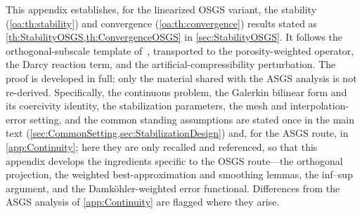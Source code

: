 This appendix establishes, for the linearized OSGS variant, the stability
(\cref{oa:th:stability}) and convergence (\cref{oa:th:convergence}) results stated as
\cref{th:StabilityOSGS,th:ConvergenceOSGS} in \cref{sec:StabilityOSGS}. It follows the orthogonal-subscale template
of~\cite{codina2008analysis}, transported to the porosity-weighted operator, the Darcy
reaction term, and the artificial-compressibility perturbation. The proof is developed in
full; only the material shared with the ASGS analysis is not re-derived. Specifically, the
continuous problem, the Galerkin bilinear form and its coercivity identity, the stabilization
parameters, the mesh and interpolation-error setting, and the common standing assumptions are
stated once in the main text (\cref{sec:CommonSetting,sec:StabilizationDesign}) and, for the
ASGS route, in \cref{app:Continuity}; here they are only recalled and referenced, so that this
appendix develops the ingredients specific to the OSGS route---the orthogonal projection, the
weighted best-approximation and smoothing lemmas, the inf--sup argument, and the
Damk\"ohler-weighted error functional. Differences from the ASGS analysis of
\cref{app:Continuity} are flagged where they arise.

